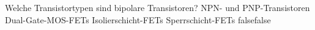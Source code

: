     {Welche Transistortypen sind bipolare Transistoren?}
    {NPN- und PNP-Transistoren}
    {Dual-Gate-MOS-FETs}
    {Isolierschicht-FETs}
    {Sperrschicht-FETs}
    {false}{false}